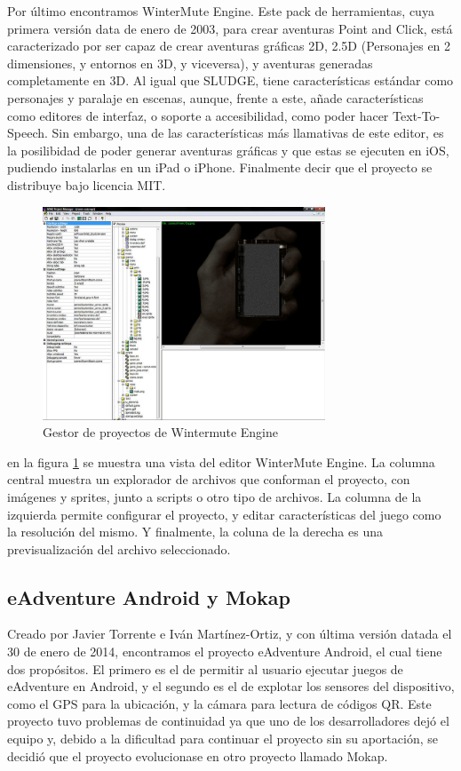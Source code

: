 Por último encontramos WinterMute Engine. Este pack de herramientas, cuya primera versión data de enero de 2003, para crear aventuras Point and Click, está caracterizado por ser capaz de crear aventuras gráficas 2D, 2.5D (Personajes en 2 dimensiones, y entornos en 3D, y viceversa), y aventuras generadas completamente en 3D. Al igual que SLUDGE, tiene características estándar como personajes y paralaje en escenas, aunque, frente a este, añade características como editores de interfaz, o soporte a accesibilidad, como poder hacer Text-To-Speech. Sin embargo, una de las características más llamativas de este editor, es la posilibidad de poder generar aventuras gráficas y que estas se ejecuten en iOS, pudiendo instalarlas en un iPad o iPhone. Finalmente decir que el proyecto se distribuye bajo licencia MIT.

\begin{figure}[htb]
	\includegraphics[height=2.5in]{figures/wme.jpg}
	\caption[WinterMute Engine]{Gestor de proyectos de Wintermute Engine}
	\label{wmengine}
\end{figure}

en la figura \ref{wmengine} se muestra una vista del editor WinterMute Engine. La columna central muestra un explorador de archivos que conforman el proyecto, con imágenes y sprites, junto a scripts o otro tipo de archivos. La columna de la izquierda permite configurar el proyecto, y editar características del juego como la resolución del mismo. Y finalmente, la coluna de la derecha es una previsualización del archivo seleccionado.

\subsection{eAdventure Android y Mokap}
\label{eandroidmokap}

Creado por Javier Torrente e Iván Martínez-Ortiz, y con última versión datada el 30 de enero de 2014, encontramos el proyecto eAdventure Android, el cual tiene dos propósitos. El primero es el de permitir al usuario ejecutar juegos de eAdventure en Android, y el segundo es el de explotar los sensores del dispositivo, como el GPS para la ubicación, y la cámara para lectura de códigos QR. Este proyecto tuvo problemas de continuidad ya que uno de los desarrolladores dejó el equipo y, debido a la dificultad para continuar el proyecto sin su aportación, se decidió que el proyecto evolucionase en otro proyecto llamado Mokap.

